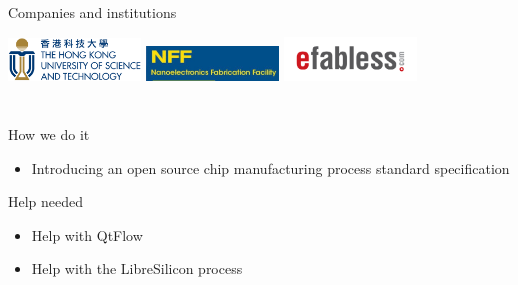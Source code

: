 \documentclass[9pt]{beamer}
\begin{document}
\begin{frame}{Companies and institutions}
	\begin{center}
		\includegraphics[width=100pt]{HKUST_Logo.png}
		\includegraphics[width=100pt]{NFF.jpg}
		\includegraphics[width=100pt]{efabless_logo.png}
	\end{center}
\end{frame}

\section[How]{}
\begin{frame}{How we do it}
	\begin{itemize}
		\item Introducing an open source chip manufacturing process standard specification
	\end{itemize}
\end{frame}

\begin{frame}{Help needed}
	\begin{itemize}
		\item Help with QtFlow\footnotemark
		\item Help with the LibreSilicon process\footnotemark
	\end{itemize}
	
\end{frame}
\end{document}

